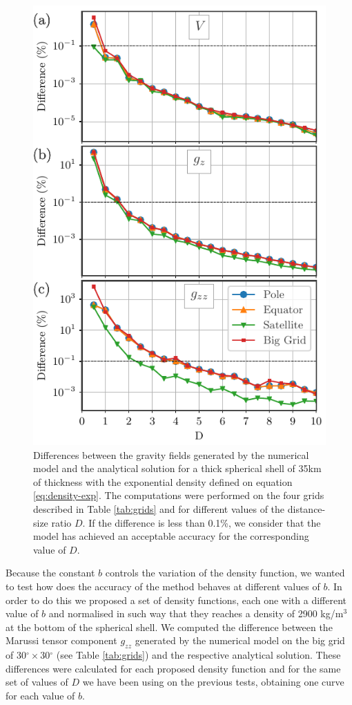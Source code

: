 \documentclass[extra]{gji}
\begin{document}
\begin{figure}
\centering
\includegraphics[width=0.9\linewidth]{figures/Dexp-shifted-thick-differences.pdf}
\caption{
    Differences between the gravity fields generated by the numerical model and the analytical solution for a thick spherical shell of 35km of thickness with the exponential density defined on equation \ref{eq:density-exp}. The computations were performed on the four grids described in Table \ref{tab:grids} and for different values of the distance-size ratio $D$. If the difference is less than 0.1\%, we consider that the model has achieved an acceptable accuracy for the corresponding value of $D$.
}
\label{fig:D-exp-thick}
\end{figure}

Because the constant $b$ controls the variation of the density function, we wanted to test how does the accuracy of the method behaves at different values of $b$.
In order to do this we proposed a set of density functions, each one with a different value of $b$ and normalised in such way that they reaches a density of 2900 kg/m$^{3}$ at the bottom of the spherical shell.
We computed the difference between the Marussi tensor component $g_{zz}$ generated by the numerical model on the big grid of 30$^\circ\times$30$^\circ$ (see Table \ref{tab:grids}) and the respective analytical solution.
These differences were calculated for each proposed density function and for the same set of values of $D$ we have been using on the previous tests, obtaining one curve for each value of $b$.
\end{document}
